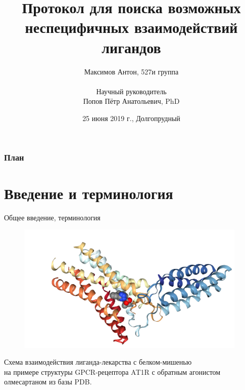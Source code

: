 \documentclass[14pt]{beamer}
\title[Short title]{Протокол для поиска 
	возможных неспецифичных
	взаимодействий лигандов} %
\author{Максимов Антон, 527и группа\\
	$\:$\\
Научный руководитель\\
Попов Пётр Анатольевич, PhD} %
\institute[МФТИ] %
{
\small Московский физико-технический институт\\
(национальный исследовательский университет) \\ %
\medskip
}
\date{ 25 июня 2019 г., Долгопрудный} %
\begin{document}
\begin{frame}
\titlepage %
\end{frame}

\begin{frame}
\frametitle{План} %
\tableofcontents %
\end{frame}



\section{Введение и терминология}
\begin{frame}{Общее введение, терминология}
    \begin{figure}[H]
    	\centering
    	\includegraphics[width=110mm]{../pictures/4zud_screenshot}
    \end{figure}
	\small \centering Схема взаимодействия 
	лиганда-лекарства с белком-мишенью\\
	на примере структуры GPCR-рецептора AT1R с обратным агонистом олмесартаном из базы PDB.
	
\end{frame}
    
\end{document}
